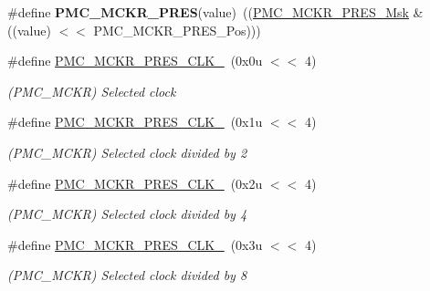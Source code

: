\begin{DoxyCompactItemize}
\#define {\bfseries P\+M\+C\+\_\+\+M\+C\+K\+R\+\_\+\+P\+R\+ES}(value)~((\mbox{\hyperlink{group__SAMV71__PMC_gadc14167dbb6ea635a41df3b41c8b9e84}{P\+M\+C\+\_\+\+M\+C\+K\+R\+\_\+\+P\+R\+E\+S\+\_\+\+Msk}} \& ((value) $<$$<$ P\+M\+C\+\_\+\+M\+C\+K\+R\+\_\+\+P\+R\+E\+S\+\_\+\+Pos)))
\item 
\mbox{\label{group__SAMV71__PMC_ga87c51808043d0df9e79baf64dcd172df}} 
\#define \mbox{\hyperlink{group__SAMV71__PMC_ga87c51808043d0df9e79baf64dcd172df}{P\+M\+C\+\_\+\+M\+C\+K\+R\+\_\+\+P\+R\+E\+S\+\_\+\+C\+L\+K\+\_}}~(0x0u $<$$<$ 4)
\begin{DoxyCompactList}\small\item\em (P\+M\+C\+\_\+\+M\+C\+KR) Selected clock \end{DoxyCompactList}\item 
\mbox{\label{group__SAMV71__PMC_ga1e304039640aaab4c22e5226c0b21f41}} 
\#define \mbox{\hyperlink{group__SAMV71__PMC_ga1e304039640aaab4c22e5226c0b21f41}{P\+M\+C\+\_\+\+M\+C\+K\+R\+\_\+\+P\+R\+E\+S\+\_\+\+C\+L\+K\+\_}}~(0x1u $<$$<$ 4)
\begin{DoxyCompactList}\small\item\em (P\+M\+C\+\_\+\+M\+C\+KR) Selected clock divided by 2 \end{DoxyCompactList}\item 
\mbox{\label{group__SAMV71__PMC_ga0e5f5657a40b36bdb8cf9c194d071b78}} 
\#define \mbox{\hyperlink{group__SAMV71__PMC_ga0e5f5657a40b36bdb8cf9c194d071b78}{P\+M\+C\+\_\+\+M\+C\+K\+R\+\_\+\+P\+R\+E\+S\+\_\+\+C\+L\+K\+\_}}~(0x2u $<$$<$ 4)
\begin{DoxyCompactList}\small\item\em (P\+M\+C\+\_\+\+M\+C\+KR) Selected clock divided by 4 \end{DoxyCompactList}\item 
\mbox{\label{group__SAMV71__PMC_gac6733179b1d3014df5d1a5e39faebf3c}} 
\#define \mbox{\hyperlink{group__SAMV71__PMC_gac6733179b1d3014df5d1a5e39faebf3c}{P\+M\+C\+\_\+\+M\+C\+K\+R\+\_\+\+P\+R\+E\+S\+\_\+\+C\+L\+K\+\_}}~(0x3u $<$$<$ 4)
\begin{DoxyCompactList}\small\item\em (P\+M\+C\+\_\+\+M\+C\+KR) Selected clock divided by 8 \end{DoxyCompactList}\item 
$$
\end{DoxyCompactItemize}

